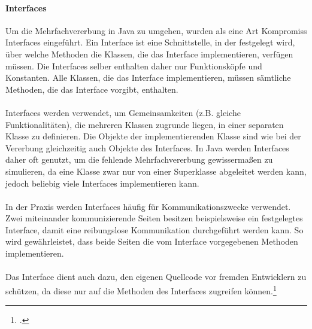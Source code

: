 \paragraph{Interfaces}
Um die Mehrfachvererbung in Java zu umgehen, wurden als eine Art Kompromiss Interfaces eingeführt. Ein Interface ist eine Schnittstelle, in der festgelegt wird, über welche Methoden die Klassen, die das Interface implementieren, verfügen müssen. Die Interfaces selber enthalten daher nur Funktionsköpfe und Konstanten. Alle Klassen, die das Interface implementieren, müssen sämtliche Methoden, die das Interface vorgibt, enthalten.\\
\\
Interfaces werden verwendet, um Gemeinsamkeiten (z.B. gleiche Funktionalitäten), die mehreren Klassen zugrunde liegen, in einer separaten Klasse zu definieren. Die Objekte der implementierenden Klasse sind wie bei der Vererbung gleichzeitig auch Objekte des Interfaces. In Java werden Interfaces daher oft genutzt, um die fehlende Mehrfachvererbung gewissermaßen zu simulieren, da eine Klasse zwar nur von einer Superklasse abgeleitet werden kann, jedoch beliebig viele Interfaces implementieren kann.\\
\\
In der Praxis werden Interfaces häufig für Kommunikationszwecke verwendet. Zwei miteinander kommunizierende Seiten besitzen beispielsweise ein festgelegtes Interface, damit eine reibungslose Kommunikation durchgeführt werden kann. So wird gewährleistet, dass beide Seiten die vom Interface vorgegebenen Methoden implementieren.\\
\\
Das Interface dient auch dazu, den eigenen Quellcode vor fremden Entwicklern zu schützen, da diese nur auf die Methoden des Interfaces zugreifen können.\footcite{shit_java_tut}

